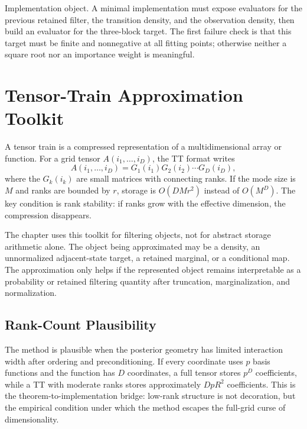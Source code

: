 Implementation object.  A minimal implementation must expose evaluators for the
previous retained filter, the transition density, and the observation density,
then build an evaluator for the three-block target.  The first failure check is
that this target must be finite and nonnegative at all fitting points; otherwise
neither a square root nor an importance weight is meaningful.

\section{Tensor-Train Approximation Toolkit}
\label{sec:bf-hd-tt-toolkit}

A tensor train is a compressed representation of a multidimensional array or
function.  For a grid tensor \(A(i_1,\ldots,i_D)\), the TT format writes
\begin{equation}
  A(i_1,\ldots,i_D)=G_1(i_1)G_2(i_2)\cdots G_D(i_D),
  \label{eq:bf-hd-tt-format}
\end{equation}
where the \(G_k(i_k)\) are small matrices with connecting ranks.  If the mode
size is \(M\) and ranks are bounded by \(r\), storage is \(O(DMr^2)\) instead
of \(O(M^D)\).  The key condition is rank stability: if ranks grow with the
effective dimension, the compression disappears.

The chapter uses this toolkit for filtering objects, not for abstract storage
arithmetic alone.  The object being approximated may be a density, an
unnormalized adjacent-state target, a retained marginal, or a conditional map.
The approximation only helps if the represented object remains interpretable as a
probability or retained filtering quantity after truncation, marginalization, and
normalization.

\subsection{Rank-Count Plausibility}
\label{sec:bf-hd-rank-plausibility}

The method is plausible when the posterior geometry has limited interaction width
after ordering and preconditioning.  If every coordinate uses \(p\) basis
functions and the function has \(D\) coordinates, a full tensor stores
\(p^D\) coefficients, while a TT with moderate ranks stores approximately
\(DpR^2\) coefficients.  This is the theorem-to-implementation bridge: low-rank
structure is not decoration, but the empirical condition under which the method
escapes the full-grid curse of dimensionality.

